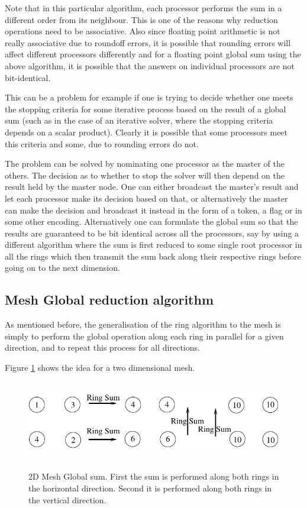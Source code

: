 Note that in this particular algorithm, each processor performs the
sum in a different order from its neighbour. This is one of the
reasons why reduction operations need to be associative. Also since
floating point arithmetic is not really associative due to roundoff
errors, it is possible that rounding errors will affect different
processors differently and for a floating point global sum using the
above algorithm, it is possible that the answers on individual
processors are not bit-identical.

This can be a problem for example if one is trying to decide whether one 
meets the stopping criteria for some iterative process based on the result
of a global sum (such as in the case of an iterative solver, where the 
stopping criteria depends on a scalar product). Clearly it is possible
that some processors meet this criteria and some, due to rounding errors
do not. 

The problem can be solved by nominating one processor as the master of
the others. The decision as to whether to stop the solver will then
depend on the result held by the master node. One can either broadcast
the master's result and let each processor make its decision based on
that, or alternatively the master can make the decision and broadcast
it instead in the form of a token, a flag or in some other encoding.
Alternatively one can formulate the global sum so that the results are
guaranteed to be bit identical across all the processors, say by using
a different algorithm where the sum is first reduced to some single root 
processor in all the rings which then transmit the sum back along their
respective rings before going on to the next dimension.

\subsection{Mesh Global reduction algorithm}
As mentioned before, the generalisation of the ring algorithm to the 
mesh is simply to perform the global operation along each ring in
parallel for a given direction, and to repeat this process for 
all directions. 

Figure \ref{f:2DMeshsum} shows the idea for a two dimensional mesh.
\begin{figure}
\begin{center}
\leavevmode
\hbox{%
\includegraphics{mesh_sum}
}
\end{center}
\caption{2D Mesh Global sum. First the sum is performed along both 
rings in the horizontal direction. Second it is performed along 
both rings in the vertical direction.}
\label{f:2DMeshsum}
\end{figure}

